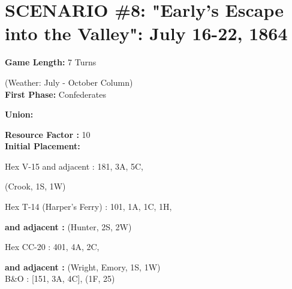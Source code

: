 \section{SCENARIO \#8: "Early's Escape into the Valley": July 16-22, 1864
}


\begin{scenariodata}
\textbf{Game Length:} 7 Turns\\
\end{scenariodata}

\begin{scenariodata}
(Weather: July - October Column)\\
\textbf{First Phase:} Confederates\\
\end{scenariodata}

\begin{scenariodata}
\textbf{Union:}\\
\end{scenariodata}

\begin{scenariodata}
\textbf{Resource Factor :} 10\\
\textbf{Initial Placement:}\\
\end{scenariodata}

\begin{scenariodata}
Hex V-15 and adjacent : 181, 3A, 5C,\\
\end{scenariodata}

(Crook, 1S, 1W)

\begin{scenariodata}
Hex T-14 (Harper's Ferry) : 101, 1A, 1C, 1H,\\
\end{scenariodata}

\begin{scenariodata}
\textbf{and adjacent :} (Hunter, 2S, 2W)\\
\end{scenariodata}

\begin{scenariodata}
Hex CC-20 : 401, 4A, 2C,\\
\end{scenariodata}

\begin{scenariodata}
\textbf{and adjacent :} (Wright, Emory, 1S, 1W)\\
B\&O : [151, 3A, 4C], (1F, 25)\\
\end{scenariodata}

